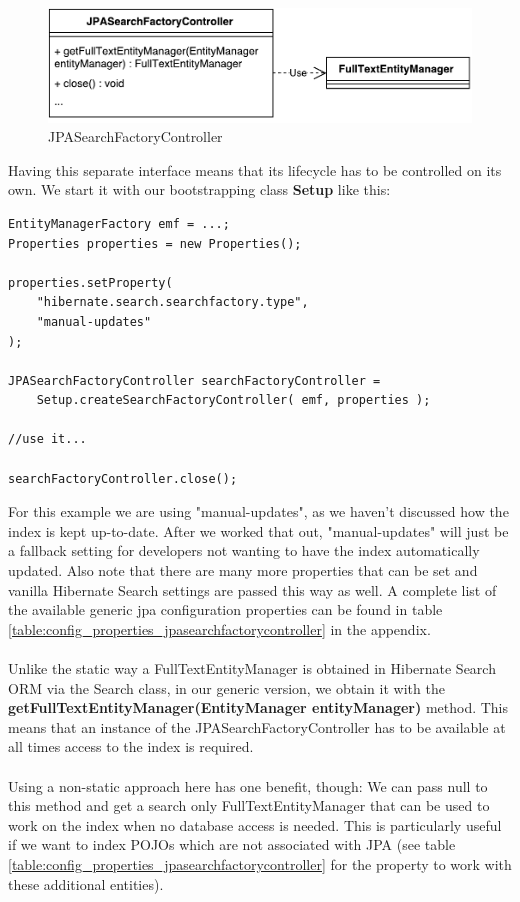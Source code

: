 \begin{figure}[ht]
	\centering
	\includegraphics[scale=0.6]{images/JPASearchFactoryController.pdf}
	\caption{JPASearchFactoryController}
	\label{jpa_searchfactory_controller}
\end{figure}
\noindent
Having this separate interface means that its lifecycle has to be controlled on its own. We start it with our bootstrapping class \textbf{Setup} like this:
\\
\lstset{language=java}
\begin{lstlisting}[frame=htrbl, caption={MassIndexer usage with Hibernate Search ORM}, label={lst:massindexing_hsearch_orm.java}]
EntityManagerFactory emf = ...;
Properties properties = new Properties();

properties.setProperty(
	"hibernate.search.searchfactory.type", 
	"manual-updates"
);

JPASearchFactoryController searchFactoryController =
	Setup.createSearchFactoryController( emf, properties );

//use it...

searchFactoryController.close();
\end{lstlisting}
\noindent
For this example we are using "manual-updates", as we haven't discussed how the index is kept up-to-date. After we worked that out, "manual-updates" will just be a fallback setting for developers not wanting to have the index automatically updated.  Also note that there are many more properties that can be set and vanilla Hibernate Search settings are passed this way as well. A complete list of the available generic jpa configuration properties can be found in table \ref{table:config_properties_jpasearchfactorycontroller} in the appendix.
\\\\
Unlike the static way a FullTextEntityManager is obtained in Hibernate Search ORM via the Search class, in our generic version, we obtain it with the \textbf{getFullTextEntityManager(EntityManager entityManager)} method. This means that an instance of the JPASearchFactoryController has to be available at all times access to the index is required.
\\\\
Using a non-static approach here has one benefit, though: We can pass null to this method and get a search only FullTextEntityManager that can be used to work on the index when no database access is needed. This is particularly useful if we want to index POJOs which are not associated with JPA (see table \ref{table:config_properties_jpasearchfactorycontroller} for the property to work with these additional entities).

